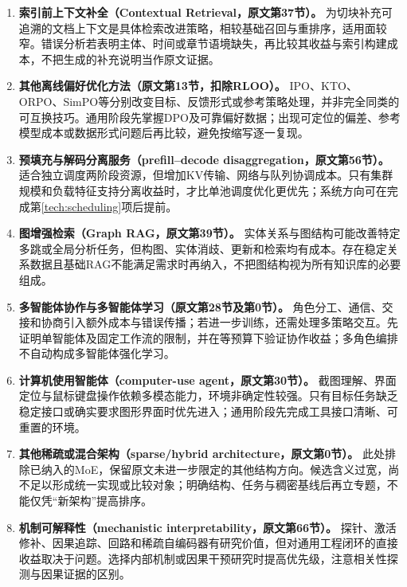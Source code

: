 \documentclass[UTF8,12pt,a4paper,fontset=fandol]{ctexart}
\begin{document}
\begin{enumerate}[resume=techrank]
\item \textbf{索引前上下文补全（Contextual Retrieval，原文第37节）。}\label{tech:contextual}
为切块补充可追溯的文档上下文是具体检索改进策略\cite{contextual}，相较基础召回与重排序，适用面较窄。错误分析若表明主体、时间或章节语境缺失，再比较其收益与索引构建成本，不把生成的补充说明当作原文证据。

\item \textbf{其他离线偏好优化方法（原文第13节，扣除RLOO）。}\label{tech:prefvariants}
IPO、KTO、ORPO、SimPO等分别改变目标、反馈形式或参考策略处理，并非完全同类的可互换技巧。通用阶段先掌握DPO及可靠偏好数据；出现可定位的偏差、参考模型成本或数据形式问题后再比较，避免按缩写逐一复现。

\item \textbf{预填充与解码分离服务（prefill--decode disaggregation，原文第56节）。}\label{tech:disaggregation}
适合独立调度两阶段资源，但增加KV传输、网络与队列协调成本。只有集群规模和负载特征支持分离收益时，才比单池调度优化更优先；系统方向可在完成第\ref{tech:scheduling}项后提前。

\item \textbf{图增强检索（Graph RAG，原文第39节）。}\label{tech:graphrag}
实体关系与图结构可能改善特定多跳或全局分析任务，但构图、实体消歧、更新和检索均有成本。存在稳定关系数据且基础RAG不能满足需求时再纳入，不把图结构视为所有知识库的必要组成。

\item \textbf{多智能体协作与多智能体学习（原文第28节及第0节）。}\label{tech:multiagent}
角色分工、通信、交接和协商引入额外成本与错误传播；若进一步训练，还需处理多策略交互。先证明单智能体及固定工作流的限制，并在等预算下验证协作收益；多角色编排不自动构成多智能体强化学习。

\item \textbf{计算机使用智能体（computer-use agent，原文第30节）。}\label{tech:computeruse}
截图理解、界面定位与鼠标键盘操作依赖多模态能力，环境非确定性较强。只有目标任务缺乏稳定接口或确实要求图形界面时优先进入；通用阶段先完成工具接口清晰、可重置的环境。

\item \textbf{其他稀疏或混合架构（sparse/hybrid architecture，原文第0节）。}\label{tech:hybridarch}
此处排除已纳入的MoE，保留原文未进一步限定的其他结构方向。候选含义过宽，尚不足以形成统一实现或比较对象；明确结构、任务与稠密基线后再立专题，不能仅凭“新架构”提高排序。

\item \textbf{机制可解释性（mechanistic interpretability，原文第66节）。}\label{tech:interpretability}
探针、激活修补、因果追踪、回路和稀疏自编码器有研究价值，但对通用工程闭环的直接收益取决于问题。选择内部机制或因果干预研究时提高优先级，注意相关性探测与因果证据的区别。


\end{enumerate}
\end{document}
